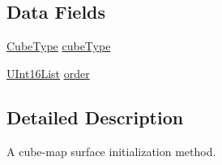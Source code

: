 \subsection*{Data Fields}
\begin{DoxyCompactItemize}
\item 
\hyperlink{classFCDEffectParameterSurfaceInitCube_a59228097e934d37b9e8ae788a749bc07}{CubeType} \hyperlink{classFCDEffectParameterSurfaceInitCube_af13376d1509627b73843e631db0abffb}{cubeType}
\item 
\hyperlink{classfm_1_1vector}{UInt16List} \hyperlink{classFCDEffectParameterSurfaceInitCube_abb0a85514c43581c62d9b1167d329035}{order}
\end{DoxyCompactItemize}


\subsection{Detailed Description}
A cube-\/map surface initialization method. 


